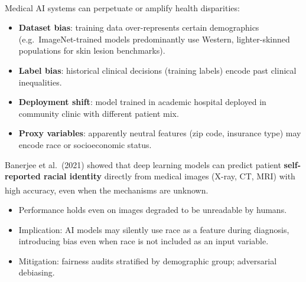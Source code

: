\begin{tcbitemize}[ skin=sectionraster ]
    \tcbitem[title={Sources of Bias in Healthcare AI}, raster multicolumn=3]
    Medical AI systems can perpetuate or amplify health disparities\textsuperscript{\cite[][p.~232]{challenArtificialIntelligenceBias2019}}:
    \begin{itemize}
        \item \textbf{Dataset bias}: training data over-represents certain demographics (e.g.\ ImageNet-trained models predominantly use Western, lighter-skinned populations for skin lesion benchmarks).
        \item \textbf{Label bias}: historical clinical decisions (training labels) encode past clinical inequalities.
        \item \textbf{Deployment shift}: model trained in academic hospital deployed in community clinic with different patient mix.
        \item \textbf{Proxy variables}: apparently neutral features (zip code, insurance type) may encode race or socioeconomic status.
    \end{itemize}

    \tcbitem[title={Racial Identity in Medical Images}, raster multicolumn=3]
    Banerjee et al.\ (2021) showed that deep learning models can predict patient \textbf{self-reported racial identity} directly from medical images (X-ray, CT, MRI) with high accuracy, even when the mechanisms are unknown\textsuperscript{\cite[][]{banerjeeReadingRaceAI2021}}.
    \begin{itemize}
        \item Performance holds even on images degraded to be unreadable by humans.
        \item Implication: AI models may silently use race as a feature during diagnosis, introducing bias even when race is not included as an input variable.
        \item Mitigation: fairness audits stratified by demographic group; adversarial debiasing.
    \end{itemize}


\end{tcbitemize}

